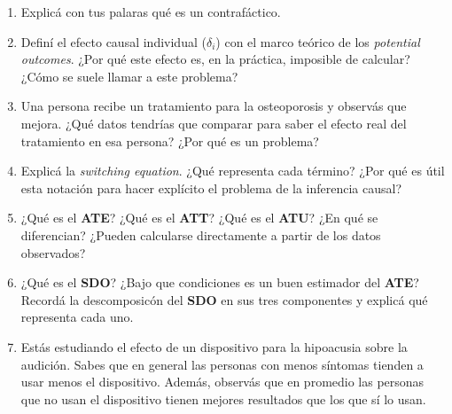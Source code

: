 \documentclass[
  letterpaper,
  DIV=11,
  numbers=noendperiod,
  oneside]{scrreprt}
\begin{document}
\begin{enumerate}
\def\labelenumi{\arabic{enumi}.}
\item
  Explicá con tus palaras qué es un contrafáctico.
\item
  Definí el efecto causal individual (\(\delta_i\)) con el marco teórico
  de los \emph{potential outcomes}. ¿Por qué este efecto es, en la
  práctica, imposible de calcular? ¿Cómo se suele llamar a este
  problema?
\item
  Una persona recibe un tratamiento para la osteoporosis y observás que
  mejora. ¿Qué datos tendrías que comparar para saber el efecto real del
  tratamiento en esa persona? ¿Por qué es un problema?
\item
  Explicá la \emph{switching equation}. ¿Qué representa cada término?
  ¿Por qué es útil esta notación para hacer explícito el problema de la
  inferencia causal?
\item
  ¿Qué es el \textbf{ATE}? ¿Qué es el \textbf{ATT}? ¿Qué es el
  \textbf{ATU}? ¿En qué se diferencian? ¿Pueden calcularse directamente
  a partir de los datos observados?
\item
  ¿Qué es el \textbf{SDO}? ¿Bajo que condiciones es un buen estimador
  del \textbf{ATE}? Recordá la descomposicón del \textbf{SDO} en sus
  tres componentes y explicá qué representa cada uno.
\item
  Estás estudiando el efecto de un dispositivo para la hipoacusia sobre
  la audición. Sabes que en general las personas con menos síntomas
  tienden a usar menos el dispositivo. Además, observás que en promedio
  las personas que no usan el dispositivo tienen mejores resultados que
  los que sí lo usan.


\end{enumerate}
\end{document}
